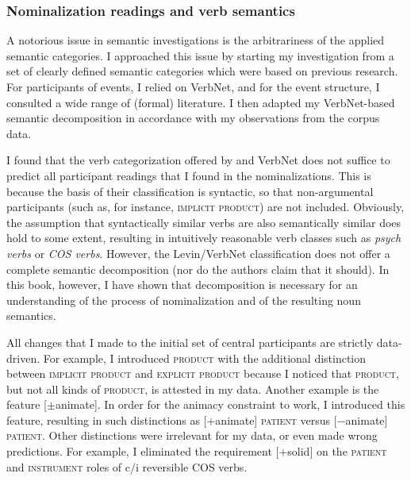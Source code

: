 \subsubsection{Nominalization readings and verb semantics}
A notorious issue in semantic investigations is the arbitrariness of the applied semantic categories. I approached this issue by starting my investigation from a set of clearly defined semantic categories which were based on previous research. For participants of events, I relied on VerbNet, and for the event structure, I consulted a wide range of (formal) literature. 
I then adapted my VerbNet-based semantic decomposition in accordance with my observations from the corpus data.

I found that the verb categorization offered by \citet{Levin.1993} and VerbNet does not suffice to predict all participant readings that I found in the nominalizations. This is because the basis of their classification is syntactic, so that non-argumental participants (such as, for instance, \textsc{implicit product}) are not included. 
Obviously, the assumption that syntactically similar verbs are also semantically similar does hold to some extent, resulting in intuitively reasonable verb classes such as \textit{psych verbs} or \textit{COS verbs}. However, the Levin/VerbNet classification does not offer a complete semantic decomposition (nor do the authors claim that it should). In this book, however, I have shown that decomposition is necessary for an understanding of the process of nominalization and of the resulting noun semantics.

All changes that I made to the initial set of central participants are strictly data-driven. 
For example, I introduced \textsc{product} with the additional distinction between \textsc{implicit product} and \textsc{explicit product} because I noticed that \textsc{product}, but not all kinds of \textsc{product}, is attested in my data. 
Another example is the feature [$\pm$animate]. In order for the animacy constraint to work, I introduced this feature, resulting in such distinctions as [+animate] \textsc{patient} versus [−animate] \textsc{patient}.
Other distinctions were irrelevant for my data, or even made wrong predictions. For example, I eliminated the requirement [+solid] on the \textsc{patient} and \textsc{instrument} roles of c/i reversible COS verbs.

